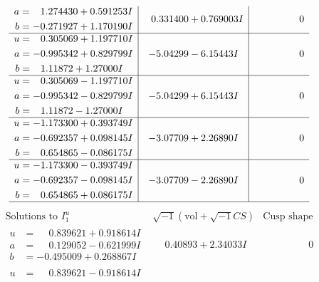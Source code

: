\documentclass[1p]{elsarticle_modified}
\theoremstyle{definition}
\newcommand{\I}{\sqrt{-1}}
\begin{document}
$$\begin{array}{c|c|c}
\begin{aligned}
a &= \phantom{-}1.274430 + 0.591253 I \\
b &= -0.271927 + 1.170190 I\end{aligned}
 & \phantom{-}0.331400 + 0.769003 I & \phantom{-0.000000 } 0 \\ \hline\begin{aligned}
u &= \phantom{-}0.305069 + 1.197710 I \\
a &= -0.995342 + 0.829799 I \\
b &= \phantom{-}1.11872 + 1.27000 I\end{aligned}
 & -5.04299 - 6.15443 I & \phantom{-0.000000 } 0 \\ \hline\begin{aligned}
u &= \phantom{-}0.305069 - 1.197710 I \\
a &= -0.995342 - 0.829799 I \\
b &= \phantom{-}1.11872 - 1.27000 I\end{aligned}
 & -5.04299 + 6.15443 I & \phantom{-0.000000 } 0 \\ \hline\begin{aligned}
u &= -1.173300 + 0.393749 I \\
a &= -0.692357 + 0.098145 I \\
b &= \phantom{-}0.654865 - 0.086175 I\end{aligned}
 & -3.07709 + 2.26890 I & \phantom{-0.000000 } 0 \\ \hline\begin{aligned}
u &= -1.173300 - 0.393749 I \\
a &= -0.692357 - 0.098145 I \\
b &= \phantom{-}0.654865 + 0.086175 I\end{aligned}
 & -3.07709 - 2.26890 I & \phantom{-0.000000 } 0\\
 \hline 
 \end{array}$$\newpage$$\begin{array}{c|c|c}  
\text{Solutions to }I^u_{1}& \I (\text{vol} + \sqrt{-1}CS) & \text{Cusp shape}\\
 \hline 
\begin{aligned}
u &= \phantom{-}0.839621 + 0.918614 I \\
a &= \phantom{-}0.129052 - 0.621999 I \\
b &= -0.495009 + 0.268867 I\end{aligned}
 & \phantom{-}0.40893 + 2.34033 I & \phantom{-0.000000 } 0 \\ \hline\begin{aligned}
u &= \phantom{-}0.839621 - 0.918614 I \\

\end{aligned}
\end{array}$$
\end{document}
